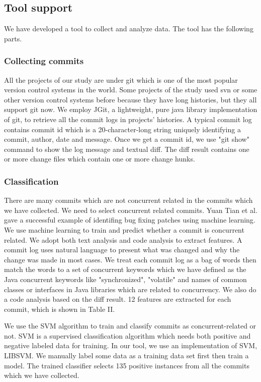 \documentclass[conference]{IEEEtran}
\begin{document}
\subsection{Tool support}
We have developed a tool to collect and analyze data. The tool has the following parts.

\subsubsection{Collecting commits}
All the projects of our study are under git which is one of the most popular version control systems in the world. Some projects of the study used svn or some other version control systems before because they have long histories, but they all support git now. We employ JGit, a  lightweight, pure java library implementation of git, to retrieve all the commit logs in projects' histories. A typical commit log contains commit id which is a 20-character-long string uniquely identifying a commit, author, date and message. Once we get a commit id, we use "git show" command to show the log message and textual diff. The diff result contains one or more change files which contain one or more change hunks.

\subsubsection{Classification}
There are many commits which are not concurrent related in the commits which we have collected.  We need to select concurrent related commits. Yuan Tian et al. gave a successful example of identifing bug fixing patches using machine learning\cite{conf/icse/TianLL12}. We use machine learning to train and predict whether a commit is concurrent related. We adopt both text analysis and code analysis to extract features. A commit log uses natural language to present what was changed and why the change was made in most cases. We treat each commit log as a bag of words then match the words to a set of concurrent keywords which we have defined as the Java concurrent keywords like "synchronized", "volatile" and names of common classes or interfaces in Java libraries which are related to concurrency. We also do a code analysis based on the diff result. 12 features are extracted for each commit, which is shown in Table II.

We use the SVM\cite{journals/ml/CortesV95} algorithm to train and classify commits as concurrent-related or not. SVM is a supervised classification algorithm which needs both positive and negative labeled data for training. In our tool, we use an implementation of SVM, LIBSVM\cite{libsvm}. We manually label some data as a training data set first then train a model. The trained classifier selects 135 positive instances from all the commits which we have collected.
\end{document}
